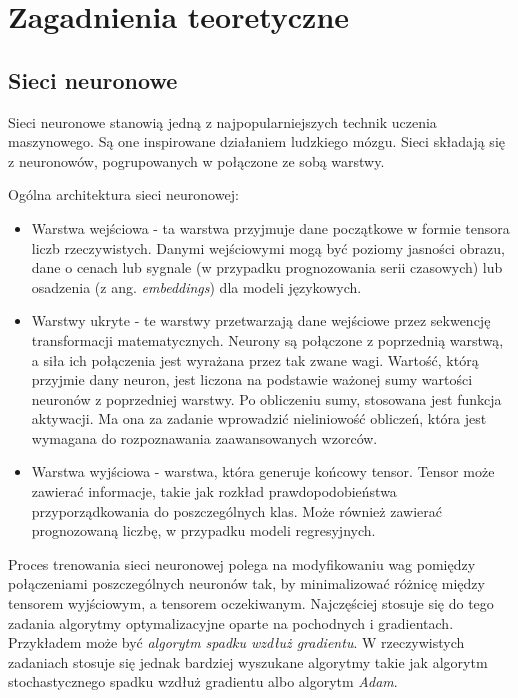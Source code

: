 \chapter{Zagadnienia teoretyczne}


\section{Sieci neuronowe}

Sieci neuronowe stanowią jedną z najpopularniejszych technik uczenia maszynowego.
Są one inspirowane działaniem ludzkiego mózgu.
Sieci składają się z neuronowów, pogrupowanych w połączone ze sobą warstwy.

Ogólna architektura sieci neuronowej:
\begin{itemize}
    \item Warstwa wejściowa - ta warstwa przyjmuje dane początkowe w formie tensora liczb rzeczywistych.
    Danymi wejściowymi mogą być poziomy jasności obrazu, dane o cenach lub sygnale (w przypadku prognozowania serii czasowych) lub osadzenia (z ang. \textit{embeddings}) dla modeli językowych.
    \item Warstwy ukryte - te warstwy przetwarzają dane wejściowe przez sekwencję transformacji matematycznych.
    Neurony są połączone z poprzednią warstwą, a siła ich połączenia jest wyrażana przez tak zwane wagi.
    Wartość, którą przyjmie dany neuron, jest liczona na podstawie ważonej sumy wartości neuronów z poprzedniej warstwy.
    Po obliczeniu sumy, stosowana jest funkcja aktywacji.
    Ma ona za zadanie wprowadzić nieliniowość obliczeń, która jest wymagana do rozpoznawania zaawansowanych wzorców.
    \item Warstwa wyjściowa - warstwa, która generuje końcowy tensor.
    Tensor może zawierać informacje, takie jak rozkład prawdopodobieństwa przyporządkowania do poszczególnych klas.
    Może również zawierać prognozowaną liczbę, w przypadku modeli regresyjnych.
\end{itemize}

Proces trenowania sieci neuronowej polega na modyfikowaniu wag pomiędzy połączeniami poszczególnych neuronów tak, by minimalizować różnicę między tensorem wyjściowym, a tensorem oczekiwanym.
Najczęściej stosuje się do tego zadania algorytmy optymalizacyjne oparte na pochodnych i gradientach.
Przykładem może być \textit{algorytm spadku wzdłuż gradientu}.
W rzeczywistych zadaniach stosuje się jednak bardziej wyszukane algorytmy takie jak algorytm stochastycznego spadku wzdłuż gradientu albo algorytm \textit{Adam}.

